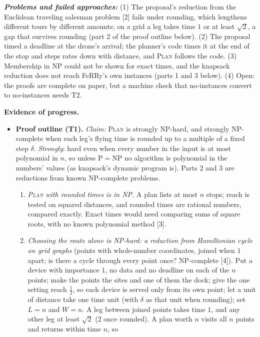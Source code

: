 \documentclass[10pt]{article}
\newcommand{\PLAN}{\textsc{Plan}}
\newcommand{\head}[1]{\par\vspace{3pt}\noindent\textbf{#1}\enspace}
\begin{document}
\textbf{\emph{Problems and failed approaches:}} (1) The proposal's reduction from the
Euclidean traveling salesman problem [2] fails under rounding, which
lengthens different tours by different amounts; on a grid a leg takes time
$1$ or at least $\sqrt2$, a gap that survives rounding (part 2 of the proof
outline below). (2) The proposal timed a deadline at the drone's arrival; the
planner's code times it at the end of the stop and steps rates down with
distance, and \PLAN{} follows the code. (3) Membership in NP could not be
shown for exact times, and the knapsack reduction does not reach FeRRy's own
instances (parts 1 and 3 below). (4) Open: the proofs are complete on paper,
but a machine check that no-instances convert to no-instances needs T2.

\head{Evidence of progress.}
\begin{itemize}
  \item \textbf{Proof outline (T1).} \emph{Claim:} \PLAN{} is strongly
    NP-hard, and strongly NP-complete when each leg's flying time is rounded
    up to a multiple of a fixed step $\delta$. \emph{Strongly}: hard even
    when every number in the input is at most polynomial in $n$, so unless
    P${}={}$NP no algorithm is polynomial in the numbers' values (as
    knapsack's dynamic program is). Parts 2 and 3 are reductions from known
    NP-complete problems.
    \begin{enumerate}
      \item \emph{\PLAN{} with rounded times is in NP.} A plan lists at most
        $n$ stops; reach is tested on squared distances, and rounded times are
        rational numbers, compared exactly. Exact times would need comparing
        sums of square roots, with no known polynomial method [3].
      \item \emph{Choosing the route alone is NP-hard: a reduction from
        Hamiltonian cycle on grid graphs} (points with whole-number
        coordinates, joined when $1$ apart; is there a cycle through every
        point once? NP-complete [4]). Put a device with importance $1$, no
        data and no deadline on each of the $n$ points; make the points the
        sites and one of them the dock; give the one setting reach
        $\tfrac12$, so each device is served only from its own point; let a
        unit of distance take one time unit (with $\delta$ as that unit when
        rounding); set $L=n$ and $W=n$. A leg between joined points takes
        time $1$, and any other leg at least $\sqrt2$ ($2$ once rounded). A
        plan worth $n$ visits all $n$ points and returns within time $n$, so

\end{enumerate}
\end{itemize}
\end{document}

